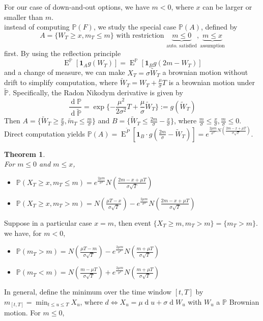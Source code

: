 \documentclass[12pt]{article}
\newtheorem{theorem}{Theorem}[section]
\theoremstyle{definition}
\DeclareMathOperator{\diff}{d}
\DeclareMathOperator{\expec}{E}
\begin{document}
For our case of down-and-out options, we have $m<0$, where $x$ can be larger or smaller than $m$.\\
instead of computing $\mathbb{P}(F)$, we study the special case $\mathbb{P}(A)$, defined by
\[
A=\{W_T\geq x, m_T\leq m\}\text{ with restriction } \underbrace{m\leq 0}_{\text{auto. satisfied}}, \underbrace{m\leq x}_{\text{assumption}}
\]
first.
By using the reflection principle 
\[
\expec^{\mathbb{P}}[\mathbf{1}_Ag(W_T)]=\expec^{\mathbb{P}}[\mathbf{1}_Bg(2m-W_T)]
\]
and a change of measure, we can make $X_T=\sigma \tilde{W}_T$ a brownian motion without drift to simplify computation, where $\tilde{W}_T=W_T+\frac{\mu}{\sigma}T$ is a brownian motion under $\tilde{\mathbb{P}}$. Specifically, the Radon Nikodym derivative is given by
\[
\frac{\diff \mathbb{P}}{\diff \tilde{\mathbb{P}}}=\exp\{-\frac{\mu^2}{2\sigma^2}T+\frac{\mu}{\sigma}\tilde{W}_T\}:=g(\tilde{W}_T)
\]
Then $A=\{\tilde{W}_T\geq \frac{x}{\sigma}, \tilde{m}_T\leq \frac{m}{\sigma}\}$ and $B=\{\tilde{W}_T\leq \frac{2m}{\sigma}-\frac{x}{\sigma}\}$, where $\frac{m}{\sigma}\leq \frac{x}{\sigma}, \frac{m}{\sigma}\leq 0$.\\
Direct computation yields $\mathbb{P}(A)=\expec^{\tilde{P}}[\mathbf{1}_B\cdot g(\frac{2m}{\sigma}-\tilde{W}_T)] = e^{\frac{2\mu m}{\sigma^2}N(\frac{2m-x+\mu T}{\sigma\sqrt{T}})}$. 
\begin{theorem}
\hfill\\\normalfont For $m\leq 0$ and $m\leq x$,
\begin{itemize}
  \item $\mathbb{P}(X_T\geq x, m_T\leq m)=e^{\frac{2\mu m}{\sigma^2}}N(\frac{2m-x+\mu T}{\sigma\sqrt{T}})$
  \item $\mathbb{P}(X_T\geq x, m_T> m)=N(\frac{\mu T-x}{\sigma\sqrt{T}})-e^{\frac{2\mu m}{\sigma^2}}N(\frac{2m-x+\mu T}{\sigma\sqrt{T}})$
\end{itemize}
\end{theorem}
Suppose in a particular case $x=m$, then event $\{X_T\geq m, m_T>m\}=\{m_T>m\}$. 
we have, for $m<0$,
\begin{itemize}
  \item $\mathbb{P}(m_T>m)=N(\frac{\mu T-m}{\sigma\sqrt{T}})-e^{\frac{2\mu m}{\sigma^2}}N(\frac{m+\mu T}{\sigma\sqrt{T}})$
  \item $\mathbb{P}(m_T<m)=N(\frac{m-\mu T}{\sigma\sqrt{T}})+e^{\frac{2\mu m}{\sigma^2}}N(\frac{m+\mu T}{\sigma\sqrt{T}})$
\end{itemize}
In general, define the minimum over the time window $[t,T]$ by $m_{[t,T]}=\min_{t\leq u\leq T}X_u$, where $d\iff X_u=\mu\diff u+\sigma \diff W_u$ with $W_u$ a $\mathbb{P}$ Brownian motion. For $m\leq 0$,
\end{document}

